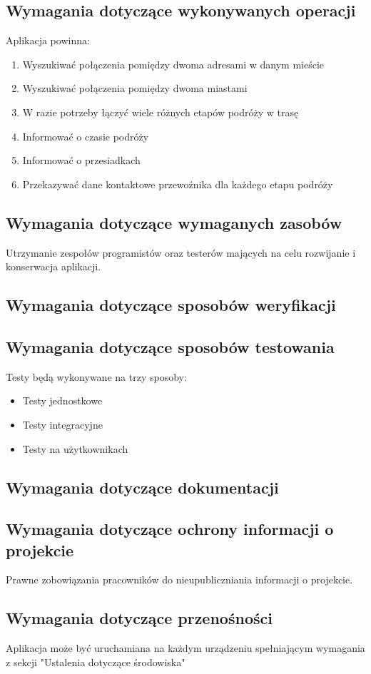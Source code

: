 \documentclass[12pt,a4paper]{report}
\begin{document}
\subsection{Wymagania dotyczące wykonywanych operacji}
	Aplikacja powinna:
	\begin{enumerate}	
		\item Wyszukiwać połączenia pomiędzy dwoma adresami w danym mieście
		\item Wyszukiwać połączenia pomiędzy dwoma miastami
		\item W razie potrzeby łączyć wiele różnych etapów podróży w trasę
		\item Informować o czasie podróży
		\item Informować o przesiadkach
		\item Przekazywać dane kontaktowe przewoźnika dla każdego etapu podróży 
	\end{enumerate}
\subsection{Wymagania dotyczące wymaganych zasobów}
	Utrzymanie zespołów programistów oraz testerów mających na celu rozwijanie i konserwacja aplikacji.
\subsection{Wymagania dotyczące sposobów weryfikacji}
\subsection{Wymagania dotyczące sposobów testowania}
Testy będą wykonywane na trzy sposoby:
\begin{itemize}
	\item Testy jednostkowe
	\item Testy integracyjne
	\item Testy na użytkownikach
\end{itemize}
\subsection{Wymagania dotyczące dokumentacji}
\subsection{Wymagania dotyczące ochrony informacji o projekcie}
	Prawne zobowiązania pracowników do nieupubliczniania informacji o projekcie.
\subsection{Wymagania dotyczące przenośności}
	Aplikacja może być uruchamiana na każdym urządzeniu spełniającym wymagania z sekcji "Ustalenia dotyczące środowiska"
\end{document}
